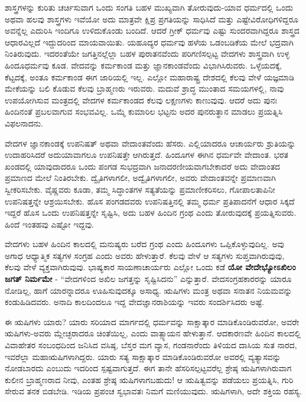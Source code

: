 ಶಾಸ್ತ್ರಗಳನ್ನು ಕುರಿತು ಚರ್ಚಿಸುವಾಗ ಒಂದು ಸಂಗತಿ ಬಹಳ ಮುಖ್ಯವಾಗಿ ತೋರುವುದು-ಯಾವ ಧರ್ಮದಲ್ಲಿ ಒಂದು ಅಥವಾ ಹಲವು ಶಾಸ್ತ್ರಗಳು ಇವೆಯೋ ಅದು ಮಾತ್ರವೇ ಕ್ಷಿಪ್ರ ಪ್ರಗತಿಯನ್ನು ಸಾಧಿಸಿದೆ ಮತ್ತು ಎಷ್ಟೇ\break ವಿರೋಧಿಗಳಿದ್ದರೂ ಅವನ್ನೆಲ್ಲ ಎದುರಿಸಿ ಇಂದಿಗೂ ಉಳಿದುಕೊಂಡು ಬಂದಿದೆ. ಆದರೆ ಗ್ರೀಕ್​ ಧರ್ಮವು ಎಷ್ಟು ಸುಂದರವಾಗಿದ್ದರೂ ಶಾಸ್ತ್ರದ ಆಧಾರವಿಲ್ಲದೆ ಇದ್ದುದರಿಂದ ಮಾಯವಾಯಿತು. ಯಹೂದ್ಯರ ಧರ್ಮವು ಹಳೆಯ ಒಡಂಬಡಿಕೆಯ ಮೇಲೆ ಭದ್ರವಾಗಿ ನಿಂತಿರುವುದು. ಇದರಂತೆಯೇ ಜಗತ್ತಿನಲ್ಲೆಲ್ಲಾ ಬಹಳ ಪುರಾತನವೆಂದು ಪರಿಗಣಿಸಲ್ಪಟ್ಟ ವೇದಗಳು ಶಾಸ್ತ್ರವಾಗಿ ಉಳ್ಳ ಹಿಂದೂಧರ್ಮವು ಕೂಡ. ವೇದವನ್ನು ಕರ್ಮಕಾಂಡ ಮತ್ತು ಜ್ಞಾನಕಾಂಡವೆಂದು ವಿಭಾಗಿ\-ಸಿರುವರು. ಒಳ್ಳೆಯದಕ್ಕೆ, ಕೆಟ್ಟದಕ್ಕೆ, ಅಂತೂ ಕರ್ಮಕಾಂಡ ಈಗ ಜಾರಿಯಲ್ಲಿ ಇಲ್ಲ. ಎಲ್ಲೋ ಮಹಾರಾಷ್ಟ್ರ ದೇಶದಲ್ಲಿ ಕೆಲವು ವೇಳೆ ಯಜ್ಞಮಾಡಿ ಮೇಕೆಯನ್ನು ಬಲಿ ಕೊಡುವ ಕೆಲವು ಬ್ರಾಹ್ಮಣರು ಇರುವರು. ಮದುವೆ ಶ್ರಾದ್ಧ ಮುಂತಾದ ಸಮಯಗಳಲ್ಲಿ, ನಾವು ಉಪಯೋಗಿಸುವ ಮಂತ್ರದಲ್ಲಿ ವೇದಗಳ ಕರ್ಮಕಾಂಡದ ಕೆಲವು ಲಕ್ಷಣಗಳು ಕಾಣುವುವು. ಆದರೆ ಅದು ಪುನಃ ಹಿಂದಿನಂತೆ ಪ್ರಬಲವಾಗುವ ಸಂಭವವಿಲ್ಲ. ಒಮ್ಮೆ ಕುಮಾರಿಲ ಭಟ್ಟನು ಅದರ ಪುನರುತ್ಥಾನ ಮಾಡಲು ಪ್ರಯತ್ನಿಸಿ ವಿಫಲನಾದನು.

ವೇದಗಳ ಜ್ಞಾನಕಾಂಡಕ್ಕೆ ಉಪನಿಷತ್​ ಅಥವಾ ವೇದಾಂತವೆಂದು ಹೆಸರು. ಎಲ್ಲಿಯಾದರೂ ಆಚಾರ್ಯರು ಶ್ರುತಿಯನ್ನು ಉದಾಹರಿಸಿದರೆ ಅದು\break ಯಾವಾಗಲೂ ಉಪನಿಷತ್ತೇ ಆಗಿರುತ್ತದೆ. ಹಿಂದೂಗಳ ಈಗಿನ ಧರ್ಮವೇ ವೇದಾಂತ. ಭರತ ಖಂಡದಲ್ಲಿ ಯಾವುದಾದರೂ ಒಂದು ಪಂಗಡ ಸುಭದ್ರವಾಗಿ ಜನಾದರಣೀಯವಾಗಬೇಕಾದರೆ ಅದು ವೇದಾಂತದ ಪ್ರಮಾಣದ ಮೇಲೆ ನಿಂತಿರಬೇಕು. ದ್ವೈತಿಗಳಾಗಲೀ, ಅದ್ವೈತಿಗಳಾಗಲೀ, ಅವರು ವೇದಾಂತವನ್ನೇ ಪ್ರಮಾಣವಾಗಿ ಸ್ವೀಕರಿಸಬೇಕು. ವೈಷ್ಣವರು ಕೂಡಾ, ತಮ್ಮ ಸಿದ್ಧಾಂತಗಳ ಸತ್ಯತೆ\-ಯನ್ನು ಪ್ರಮಾಣೀಕರಿಸಲು, ಗೋಪಾಲತಾಪಿನೀ ಉಪನಿಷತ್ತನ್ನೇ ಆಶ್ರಯಿಸಬೇಕು. ಹೊಸ ಪಂಗಡದವರು ಉಪನಿಷತ್ತಿನಲ್ಲಿ ತಮ್ಮ ಧರ್ಮ ಪ್ರತಿಪಾದನೆಗೆ ಆಧಾರ ಸಿಕ್ಕದೆ ಇದ್ದರೆ ಹೊಸ ಒಂದು ಉಪನಿಷತ್ತನ್ನೇ ಸೃಷ್ಟಿಸಿ, ಅದು ಬಹಳ ಹಿಂದಿನ ಗ್ರಂಥ ಎಂದು ತೋರುವುದಕ್ಕೆ ಪ್ರಯತ್ನಿಸುವರು. ಹಿಂದೆ ಇಂತಹವು ಎಷ್ಟೋ ಇದ್ದವು.

ವೇದಗಳು ಬಹಳ ಹಿಂದಿನ ಕಾಲದಲ್ಲಿ ಮನುಷ್ಯರು ಬರೆದ ಗ್ರಂಥ ಎಂದು ಹಿಂದೂಗಳು ಒಪ್ಪಿಕೊಳ್ಳುವುದಿಲ್ಲ. ಅವು ಅಗಾಧ ಆಧ್ಯಾತ್ಮಿಕ ಸತ್ಯಗಳ ಸಂಗ್ರಹ ಎಂದು ಅವರು ಹೇಳುತ್ತಾರೆ. ಕೆಲವು ವೇಳೆ ಆ ಸತ್ಯಗಳು ಸುಪ್ತವಾಗಿರುವುವು, ಕೆಲವು ವೇಳೆ ವ್ಯಕ್ತವಾಗಿರುವುವು. ಭಾಷ್ಯಕಾರ ಸಾಯಣಾಚಾರ್ಯರು ಎಲ್ಲೋ ಒಂದು ಕಡೆ \textbf{ಯೋ ವೇದೇಭ್ಯೋಽಖಿಲಂ ಜಗತ್​ ನಿರ್ಮಮೇ} - “ವೇದಗಳಿಂದ ಅಖಿಲ ಜಗತ್ತನ್ನು ಸೃಷ್ಟಿಸಿದನು” ಎನ್ನುತ್ತಾರೆ. ವೇದಸಂಗ್ರಹಕಾರರನ್ನು ಯಾರೂ ನೋಡಿಲ್ಲ, ಹಾಗೆ ಯಾರನ್ನಾದರೂ ಊಹಿಸುವುದಕ್ಕೂ ಅಸಾಧ್ಯ. ಋಷಿಗಳು ಮಂತ್ರ ಅಥವಾ ಸನಾತನ ನಿಯಮವನ್ನು ಕಂಡುಹಿಡಿದವರು. ಅನಾದಿ ಕಾಲದಿಂದಲೂ ಇದ್ದ ವೇದಜ್ಞಾನರಾಶಿಯನ್ನು ಇವರು ಸಂದರ್ಶಿಸಿದರು ಅಷ್ಟೆ.

ಈ ಋಷಿಗಳು ಯಾರು? ಯಾರು ಸರಿಯಾದ ಮಾರ್ಗದಲ್ಲಿ ಧರ್ಮವನ್ನು ಸಾಕ್ಷಾತ್ಕಾರ ಮಾಡಿಕೊಂಡಿರುವರೋ, ಅವರೇ ಋಷಿಗಳು-ಅವರು ಮ್ಲೇಚ್ಛರಾದರೂ ಚಿಂತೆಯಿಲ್ಲ, ಎಂದು ವಾತ್ಸ್ಯಾಯನ ಹೇಳುತ್ತಾನೆ. ಆದಕಾರಣವೇ ಹಿಂದಿನ ಕಾಲದಲ್ಲಿ ವಿವಾಹೇತರ ಸಂಬಂಧದಿಂದ ಜನಿಸಿದ ವಸಿಷ್ಠ, ಬೆಸ್ತರ ಮಗ ವ್ಯಾಸ, ಗಂಡನಾರೆಂದು ತಿಳಿಯದ ದಾಸಿಯ ಸುತ ನಾರದ, ಇವರೆಲ್ಲಾ ಮಹಾಋಷಿಗಳಾಗಿದ್ದರು. ಯಾರು ಸತ್ಯ ಸಾಕ್ಷಾತ್ಕಾರ ಮಾಡಿಕೊಂಡಿರುವರೋ ಅವರಲ್ಲಿ ವ್ಯತ್ಯಾಸವನ್ನು ನೋಡಬಾರದು ಎಂಬುದು ಇದರಿಂದ ಸ್ಪಷ್ಟವಾಗುತ್ತದೆ. ಈಗ ತಾನೇ ಹೆಸರಿಸಲ್ಪಟ್ಟವರೆಲ್ಲ ಶ್ರೇಷ್ಠ ಋಷಿಗಳಾಗಿರುವಾಗ ಕುಲೀನ ಬ್ರಾಹ್ಮಣರಾದ ನೀವು, ಎಂತಹ ಶ್ರೇಷ್ಠ ಋಷಿಗಳಾಗಬಹುದು! ಆ ಋಷಿತ್ವವನ್ನು ಪಡೆಯಲು ಪ್ರಯತ್ನಿಸಿ, ಗುರಿ ಸೇರುವ ತನಕ ಬಿಡಬೇಡಿ. ಇಡಿಯ ಪ್ರಪಂಚ ಸ್ವಭಾವತಃ ನಿಮಗೆ ಮಣಿಯುವುದು. ಋಷಿಗಳಾಗಿ, ಅದೇ ಶಕ್ತಿಯ ರಹಸ್ಯ.

